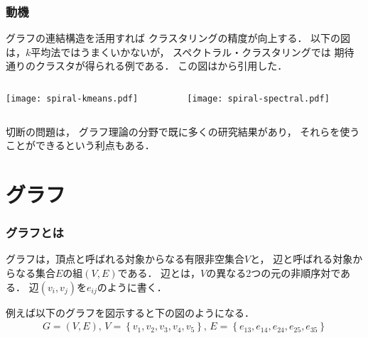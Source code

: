 \documentclass[10pt,hyperref={unicode}]{beamer}
\newcommand{\parentheses}[1]{\left(#1\right)}
\newcommand{\braces}[1]{\left\{#1\right\}}
\begin{document}
\begin{frame}
\frametitle{動機}
グラフの連結構造を活用すれば
クラスタリングの精度が向上する．
以下の図は，$k$平均法ではうまくいかないが，
スペクトラル・クラスタリングでは
期待通りのクラスタが得られる例である．
この図は\cite{murphy2012}から引用した．

    \begin{columns}
        \begin{column}{0.5\textwidth}
            \begin{center}
                \texttt{[image: spiral-kmeans.pdf]}
            \end{center}
        \end{column}
        \begin{column}{0.5\textwidth}
            \begin{center}
                \texttt{[image: spiral-spectral.pdf]}
            \end{center}
        \end{column}
    \end{columns}

切断の問題は，
グラフ理論の分野で既に多くの研究結果があり，
それらを使うことができるという利点もある．
\end{frame}


\section{グラフ}
\begin{frame}
\frametitle{グラフとは}
グラフは，頂点と呼ばれる対象からなる有限非空集合$V$と，
辺と呼ばれる対象からなる集合$E$の組$\parentheses{V,E}$である．
辺とは，$V$の異なる2つの元の非順序対である．
辺$\parentheses{v_i,v_j}$を$e_{ij}$のように書く．

\bigskip

例えば以下のグラフを図示すると下の図のようになる．
\begin{gather*}
    G = \parentheses{V,E},\,V = \braces{v_1,v_2,v_3,v_4,v_5},\,
    E = \braces{e_{13},e_{14},e_{24},e_{25},e_{35}}
\end{gather*}

\begin{center}
\end{center}
\end{frame}
\end{document}
